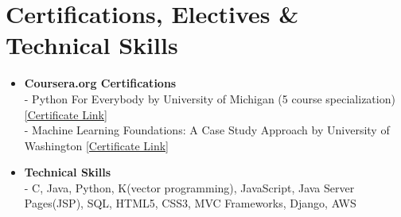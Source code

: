 \documentclass{article}
\begin{document}
\section*{Certifications, Electives \& Technical Skills}
\begin{itemize}
    \item \textbf{Coursera.org Certifications}\\
    - Python For Everybody by University of Michigan (5 course specialization) \href{https://www.coursera.org/account/accomplishments/specialization/2B5PCJGZ9WEE}{[Certificate Link]}\\
    - Machine Learning Foundations: A Case Study Approach by University of Washington \href{https://www.coursera.org/account/accomplishments/certificate/NDVXWMCYKX9N}{[Certificate Link]}
    
    \item \textbf{Technical Skills}\\
    - C, Java, Python, K(vector programming), JavaScript, Java Server Pages(JSP), SQL, HTML5, CSS3, MVC Frameworks, Django, AWS
\end{itemize}
\end{document}
